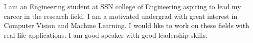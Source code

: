 

\begin{cvparagraph}

I am an Engineering student at SSN college of Engineering aspiring to lead my career in the research field. I am a motivated undergrad with great interest in Computer Vision and Machine Learning. I would like to work on these fields with real life applications. I am good speaker with good leadership skills. 
\end{cvparagraph}
